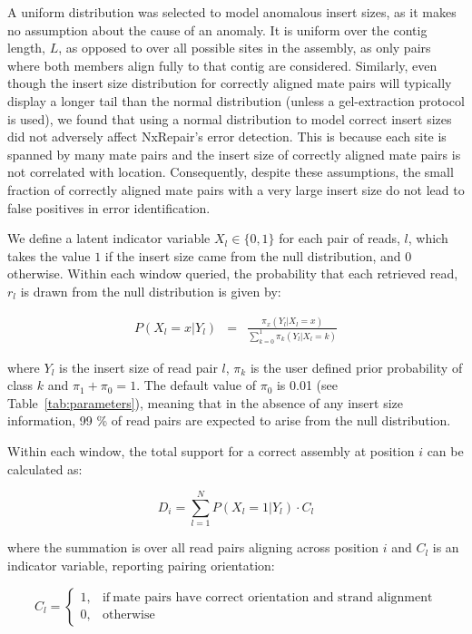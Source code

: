 A uniform distribution was selected to model anomalous insert sizes, as it makes no assumption about the cause of an anomaly. It is uniform over the contig length, $L$, as opposed to over all possible sites in the assembly, as only pairs where both members align fully to that contig are considered. Similarly, even though the insert size distribution for correctly aligned mate pairs will typically display a longer tail than the normal distribution (unless a gel-extraction protocol is used), we found that using a normal distribution to model correct insert sizes did not adversely affect NxRepair's error detection. This is because each site is spanned by many mate pairs and the insert size of correctly aligned mate pairs is not correlated with location. Consequently, despite these assumptions, the small fraction of correctly aligned mate pairs with a very large insert size do not lead to false positives in error identification. 

We define a latent indicator variable $X_l\in\{0,1\}$ for each pair of reads, $l$, which takes the value $1$ if the insert size came from the null distribution, and $0$ otherwise. Within each window queried, the probability that each retrieved read, $r_l$ is drawn from the null distribution is given by:

\begin{eqnarray} P(X_l=x|Y_l)& =& \frac{\pi_x(Y_l|X_l=x)}{\sum_{k=0}^1 \pi_k(Y_l|X_l=k)}
\label{eq:posterior}  
\end{eqnarray}

where $Y_l$ is the insert size of read pair $l$, $\pi_k$ is the user defined prior probability of class $k$ and $\pi_1 + \pi_0 = 1$. The default value of $\pi_0$ is 0.01 (see Table~\ref{tab:parameters}), meaning that in the absence of any insert size information, 99 \% of read pairs are expected to arise from the null distribution.  

Within each window, the total support for a correct assembly at position $i$ can be calculated as:

\begin{equation}
D_i = \sum_{l=1}^N P(X_l=1|Y_l)\cdot C_l
\end{equation}

where the summation is over all read pairs aligning across position $i$ and $C_l$ is an indicator variable, reporting pairing orientation:

\begin{equation}
    C_l=
    \begin{cases}
      1, & \text{if}\ \text{mate pairs have correct orientation and strand alignment} \\
      0, & \text{otherwise}
    \end{cases}
  \label{eq:C}
  \end{equation}

